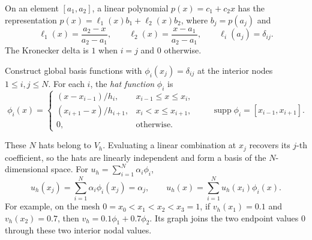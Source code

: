 \documentclass[11pt,a4paper]{article}
\begin{document}
On an element \([a_1,a_2]\), a linear polynomial \(p(x)=c_1+c_2x\) has
the representation \(p(x)=\ell_1(x)b_1+\ell_2(x)b_2\),
where \(b_j=p(a_j)\) and
\[
 \ell_1(x)=\frac{a_2-x}{a_2-a_1},\qquad
 \ell_2(x)=\frac{x-a_1}{a_2-a_1},\qquad
 \ell_i(a_j)=\delta_{ij}.
\]
The Kronecker delta is \(1\) when \(i=j\) and \(0\) otherwise.
\begin{center}
\end{center}

Construct global basis functions with \(\phi_i(x_j)=\delta_{ij}\) at
the interior nodes \(1\le i,j\le N\). For each \(i\), the \emph{hat function}
\(\phi_i\) is
\[
 \phi_i(x)=
 \begin{cases}
 (x-x_{i-1})/h_i, & x_{i-1}\le x\le x_i,\\[2pt]
 (x_{i+1}-x)/h_{i+1}, & x_i<x\le x_{i+1},\\
 0, & \text{otherwise}.
 \end{cases}
 \qquad \operatorname{supp}\phi_i=[x_{i-1},x_{i+1}].
\]
\begin{center}
\end{center}

These \(N\) hats belong to \(V_h\). Evaluating a linear combination at
\(x_j\) recovers its \(j\)-th coefficient, so the hats are linearly
independent and form a basis of the \(N\)-dimensional space.
For \(u_h=\sum_{i=1}^N\alpha_i\phi_i\),
\[
 u_h(x_j)=\sum_{i=1}^N\alpha_i\phi_i(x_j)=\alpha_j,
 \qquad
 u_h(x)=\sum_{i=1}^N u_h(x_i)\phi_i(x).
\]
For example, on the mesh \(0=x_0<x_1<x_2<x_3=1\), if
\(v_h(x_1)=0.1\) and \(v_h(x_2)=0.7\), then
\(v_h=0.1\phi_1+0.7\phi_2\). Its graph joins the two endpoint values
\(0\) through these two interior nodal values.
\end{document}
